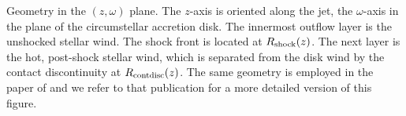 \label{fig:sketch}
Geometry in the $(z, \omega)$ plane. The $z$-axis is oriented along the jet, the $\omega$-axis in the plane of the circumstellar accretion disk. The innermost outflow layer is the unshocked stellar wind. The shock front is located at $R_{\rm{shock}}(z)$. The next layer is the hot, post-shock stellar wind, which is separated from the disk wind by the contact discontinuity at $R_{\rm{contdisc}}(z)$. The same geometry is employed in the paper of \citet{2012MNRAS.422.2282K} and we refer to that publication for a more detailed version of this figure.